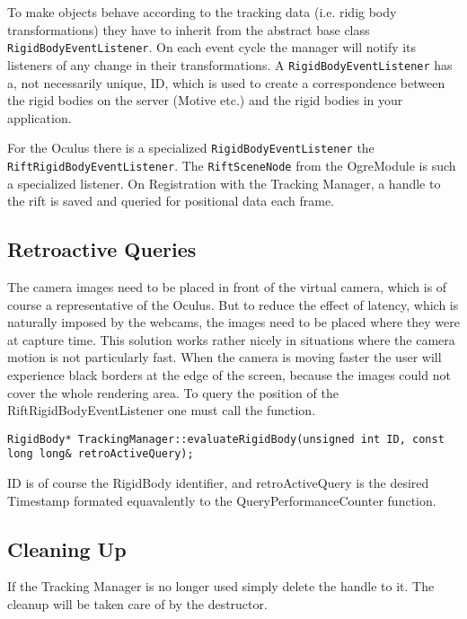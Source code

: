 To make objects behave according to the tracking data (i.e. ridig body transformations) they have to inherit from the abstract base class \texttt{RigidBodyEventListener}. On each event cycle the manager will notify its listeners of any change in their transformations. A \texttt{RigidBodyEventListener} has a, not necessarily unique, ID, which is used to create a correspondence between the rigid bodies on the server (Motive etc.) and the rigid bodies in your application.

For the Oculus there is a specialized \texttt{RigidBodyEventListener} the \texttt{\justify RiftRigidBodyEventListener}. The \texttt{RiftSceneNode} from the OgreModule is such a specialized listener. On Registration with the Tracking Manager, a handle to the rift is saved and queried for positional data each frame.


\subsection{Retroactive Queries}\label{retroactive-queries}

The camera images need to be placed in front of the virtual camera, which is of course a representative of the Oculus. But to reduce the effect of latency, which is naturally imposed by the webcams, the images need to be placed where they were at capture time. This solution works rather nicely in situations where the camera motion is not particularly fast. When the camera is moving faster the user will experience black borders at the edge of the screen, because the images could not cover the whole rendering area. To query the position of the RiftRigidBodyEventListener one must call the function.

\begin{lstlisting}
RigidBody* TrackingManager::evaluateRigidBody(unsigned int ID, const long long& retroActiveQuery);
\end{lstlisting}

ID is of course the RigidBody identifier, and retroActiveQuery is the desired Timestamp formated equavalently to the QueryPerformanceCounter function.

\subsection{Cleaning Up}\label{cleaning-up}

If the Tracking Manager is no longer used simply delete the handle to it. The cleanup will be taken care of by the destructor.